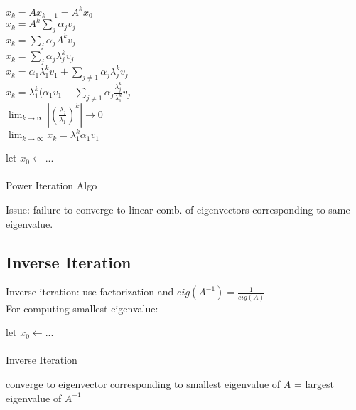 \documentclass[8pt,letter]{article}
\begin{document}
\begin{multicols*}{2}
    $x_k = A x_{k-1} = A^k x_0$\\
    $x_k = A^k \sum_j \alpha_j v_j$\\
    $x_k = \sum_j \alpha_j A^k v_j$\\
    $x_k = \sum_j \alpha_j \lambda_j^k v_j$\\
    $x_k = \alpha_1 \lambda_1^k v_1 + \sum_{j\neq1} \alpha_j \lambda_j^k v_j$\\
    $x_k = \lambda_1^k (\alpha_1 v_1 + \sum_{j\neq1} \alpha_j \frac{\lambda_j^k}{\lambda_1^k} v_j$\\
    $\lim_{k \rightarrow \infty} |(\frac{\lambda_j}{\lambda_1})^k| \rightarrow 0$\\
    $\lim_{k \rightarrow \infty} x_k = \lambda_1^k \alpha_1 v_1$

    \begin{algorithm}[H]
      let $x_0 \leftarrow ...$\\
      \\
      \caption{Power Iteration Algo \label{Algo_power_iteration}}
    \end{algorithm}
    Issue: failure to converge to linear comb. of eigenvectors corresponding to same eigenvalue.\\

    \subsection{Inverse Iteration}
    Inverse iteration: use factorization and $eig(A^{-1}) = \frac{1}{eig(A)}$\\
    
    For computing smallest eigenvalue:
    
    \begin{algorithm}[H]
      let $x_0 \leftarrow ...$\\
      \\
      \caption{Inverse Iteration \label{Algo_inverse_iteration}}
    \end{algorithm}
    converge to eigenvector corresponding to smallest eigenvalue of $A$ = largest eigenvalue of $A^{-1}$\\


\end{multicols*}
\end{document}

